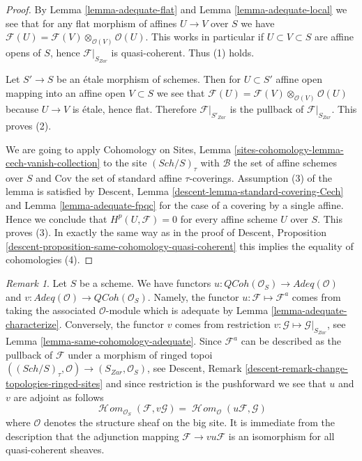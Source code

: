 \documentclass{stacks-project}
\theoremstyle{plain}
\theoremstyle{definition}
\theoremstyle{remark}
\newtheorem{remark}[subsection]{Remark}
\numberwithin{equation}{subsection}
\def\SheafHom{\mathop{\mathcal{H}\!\mathit{om}}\nolimits}
\def\Sch{\mathit{Sch}}
\def\QCoh{\mathit{QCoh}}
\begin{document}
\begin{proof}
By
Lemma \ref{lemma-adequate-flat}
and
Lemma \ref{lemma-adequate-local}
we see that for any flat morphism of affines $U \to V$ over $S$
we have
$\mathcal{F}(U) = \mathcal{F}(V) \otimes_{\mathcal{O}(V)} \mathcal{O}(U)$.
This works in particular if $U \subset V \subset S$ are affine opens of
$S$, hence $\mathcal{F}|_{S_{Zar}}$ is quasi-coherent.
Thus (1) holds.

\medskip\noindent
Let $S' \to S$ be an \'etale morphism of schemes.
Then for $U \subset S'$ affine open mapping into an affine open
$V \subset S$ we see that
$\mathcal{F}(U) = \mathcal{F}(V) \otimes_{\mathcal{O}(V)} \mathcal{O}(U)$
because $U \to V$ is \'etale, hence flat. Therefore
$\mathcal{F}|_{S'_{Zar}}$ is the pullback of $\mathcal{F}|_{S_{Zar}}$.
This proves (2).

\medskip\noindent
We are going to apply
Cohomology on Sites,
Lemma \ref{sites-cohomology-lemma-cech-vanish-collection}
to the site $(\Sch/S)_\tau$ with
$\mathcal{B}$ the set of affine schemes over $S$ and
$\text{Cov}$ the set of standard affine $\tau$-coverings.
Assumption (3) of the lemma is satisfied by
Descent, Lemma \ref{descent-lemma-standard-covering-Cech}
and
Lemma \ref{lemma-adequate-fpqc}
for the case of a covering by a single affine.
Hence we conclude that $H^p(U, \mathcal{F}) = 0$ for every
affine scheme $U$ over $S$. This proves (3).
In exactly the same way as in the proof of
Descent, Proposition \ref{descent-proposition-same-cohomology-quasi-coherent}
this implies the equality of cohomologies (4).
\end{proof}

\begin{remark}
\label{remark-compare}
Let $S$ be a scheme. We have functors
$u : \QCoh(\mathcal{O}_S) \to \textit{Adeq}(\mathcal{O})$
and
$v : \textit{Adeq}(\mathcal{O}) \to \QCoh(\mathcal{O}_S)$.
Namely, the functor $u : \mathcal{F} \mapsto \mathcal{F}^a$
comes from taking the associated $\mathcal{O}$-module which is
adequate by
Lemma \ref{lemma-adequate-characterize}.
Conversely, the functor $v$ comes from restriction
$v : \mathcal{G} \mapsto \mathcal{G}|_{S_{Zar}}$, see
Lemma \ref{lemma-same-cohomology-adequate}.
Since $\mathcal{F}^a$ can be described as the pullback of
$\mathcal{F}$ under a morphism of ringed topoi
$((\Sch/S)_\tau, \mathcal{O}) \to (S_{Zar}, \mathcal{O}_S)$, see
Descent, Remark \ref{descent-remark-change-topologies-ringed-sites}
and since restriction is the pushforward we see that $u$ and $v$
are adjoint as follows
$$
\SheafHom_{\mathcal{O}_S}(\mathcal{F}, v\mathcal{G})
=
\SheafHom_\mathcal{O}(u\mathcal{F}, \mathcal{G})
$$
where $\mathcal{O}$ denotes the structure sheaf on the big site.
It is immediate from the description that the adjunction mapping
$\mathcal{F} \to vu\mathcal{F}$ is an isomorphism for all quasi-coherent
sheaves.
\end{remark}
\end{document}
